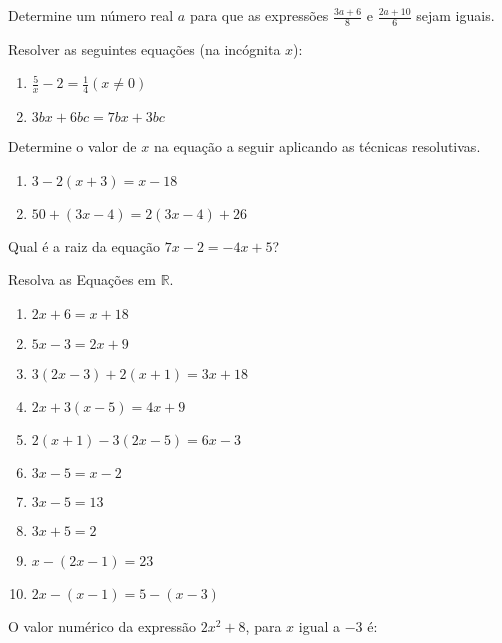        			\item Determine um número real $a$ para que as expressões $\frac{3a + 6}{8}$ e $\frac{2a + 10}{6}$ sejam iguais.
       			\item Resolver as seguintes equações (na incógnita $x$):
					\begin{multicols}{2}					
					\begin{enumerate}
		 			\item $\displaystyle\frac{5}{x} - 2 = \frac{1}{4} (x\neq 0)$
		 			\item $3bx + 6bc = 7bx + 3bc$
		 			\end{enumerate} 
		 			\end{multicols}
		 		\item Determine o valor de $x$ na equação a seguir aplicando as técnicas resolutivas.
		 			\begin{multicols}{2}
		 			\begin{enumerate}
		 				\item $3 - 2(x + 3) = x - 18$
		 				\item $50 + (3x - 4) = 2  (3x - 4) + 26$
		 			\end{enumerate}
		 			\end{multicols}
		 		\item Qual é a raiz da equação $7x - 2 = -4x + 5$?
		 		\item Resolva as Equações em $\mathbb{R}$.
		 			\begin{multicols}{2}
		 			\begin{enumerate}
		 				 \item $2x + 6 = x + 18$
		 				 \item $5x - 3 = 2x + 9$
		 				 \item $3(2x - 3) + 2(x + 1) = 3x + 18$
		 				 \item $2x + 3(x - 5) = 4x + 9$
		 				 \item $2(x + 1) - 3(2x - 5) = 6x - 3$
		 				 \item $3x - 5 = x - 2$
		 				 \item $3x - 5 = 13$
		 				 \item $3x + 5 = 2$
		 				 \item $x - (2x - 1) = 23$
		 				 \item $2x - (x - 1) = 5 - (x - 3)$   
		 			\end{enumerate}
		 			\end{multicols}
		 		\item O valor numérico da expressão $2x^2 + 8$, para $x$ igual a $-3$ é:		
		 			\setlength{\columnseprule}{0pt}
